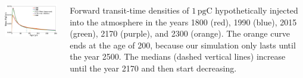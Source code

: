 \begin{columns}
	\setlength{\lc}{0.5\textwidth}
	\begin{column}{\lc}
	  \begin{center}
      \includegraphics[width=\linewidth]{images/content/ftt.pdf}
	  \end{center}
	\end{column}
	\setlength{\rc}{\the\dimexpr (\textwidth-\lc) \relax }
	\begin{column}{\rc}
    \begin{minipage}{0.95\rc}
    Forward transit-time densities of $1\, \text{pgC}$ %
      hypothetically injected into the atmosphere in the years 1800 (red), 1990 (blue), 2015 (green), 2170 (purple), and 2300 (orange).
      The orange curve ends at the age of 200, because our simulation only lasts until the year 2500.
      The medians (dashed vertical lines) increase until the year 2170 and then start decreasing.
      \label{fig:ftt}
    \end{minipage}
	\end{column}
\end{columns}
